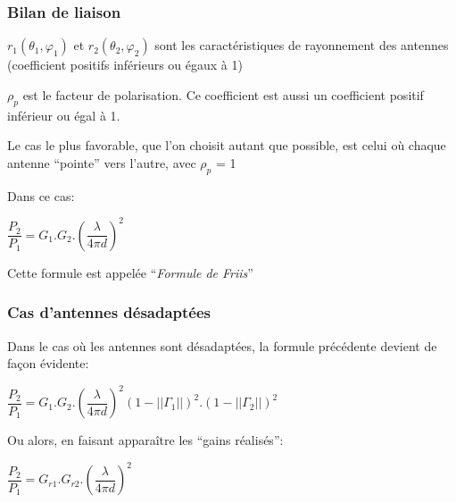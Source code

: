 \documentclass[
10pt,
aspectratio=169,
]{beamer}
\begin{document}
\begin{frame}
\frametitle{Bilan de liaison}
$r_1(\theta_1, \varphi_1)$ et $r_2(\theta_2, \varphi_2)$ sont les caractéristiques de rayonnement des
antennes (coefficient positifs inférieurs ou égaux à 1)

$\rho_p$ est le facteur de polarisation. Ce coefficient est aussi un
coefficient positif inférieur ou égal à 1.

Le cas le plus favorable, que l'on choisit autant que possible, est
celui où chaque antenne ``pointe'' vers l'autre, avec $\rho_p$ = 1

\vspace{0.5cm}
Dans ce cas:
\begin{center}
\begin{tcolorbox}[colframe=red,width=5cm]
\center$\dfrac{P_2}{P_1}=G_1.G_2.{\left(\dfrac{\lambda}{4\pi d}\right)}^2$
\end{tcolorbox}


Cette formule est appelée ``\textit{Formule de Friis}''

\end{center}
\end{frame}

\begin{frame}
\frametitle{Cas d'antennes désadaptées}
Dans le cas où les antennes sont désadaptées, 
la formule précédente devient de façon évidente:

\begin{center}
\begin{tcolorbox}[colframe=red,width=9cm]
\center$\dfrac{P_2}{P_1}=G_1.G_2.{\left(\dfrac{\lambda}{4\pi d}\right)}^2 {(1-||\Gamma_1||)}^2.{(1-||\Gamma_2||)}^2$
\end{tcolorbox}
\end{center}

\vspace{0.5cm}
Ou alors, en faisant apparaître les ``gains réalisés'':

\begin{center}
\begin{tcolorbox}[colframe=red,width=5cm]
\center$\dfrac{P_2}{P_1}=G_{r1}.G_{r2}.{\left(\dfrac{\lambda}{4\pi d}\right)}^2$
\end{tcolorbox}
\end{center}

\end{frame}
\end{document}
